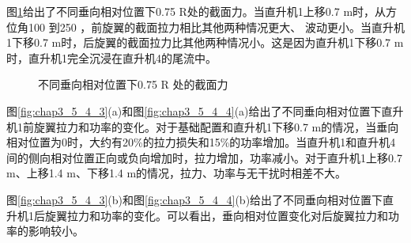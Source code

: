 图\ref{fig:chap3_5_4_2}给出了不同垂向相对位置下0.75 R处的截面力。当直升机1上移0.7 m时，从方位角100 \degree 到250 \degree，前旋翼的截面拉力相比其他两种情况更大、
波动更小。当直升机1下移0.7 m时，后旋翼的截面拉力比其他两种情况小。这是因为直升机1下移0.7 m时，直升机1完全沉浸在直升机4的尾流中。
\begin{figure}[!htb]
  \centering
  \quad
  \caption{不同垂向相对位置下0.75 R 处的截面力}
  \label{fig:chap3_5_4_2}
\end{figure}

图\ref{fig:chap3_5_4_3}(a)和图\ref{fig:chap3_5_4_4}(a)给出了不同垂向相对位置下直升机1前旋翼拉力和功率的变化。对于基础配置和直升机1下移0.7 m的情况，当垂向相对位置为0时，大约有20\%的拉力损失和15\%的功率增加。当直升机1和直升机4间的侧向相对位置正向或负向增加时，拉力增加，功率减小。对于直升机1上移0.7 m、上移1.4 m、下移1.4 m的情况，拉力、功率与无干扰时相差不大。

图\ref{fig:chap3_5_4_3}(b)和图\ref{fig:chap3_5_4_4}(b)给出了不同垂向相对位置下直升机1后旋翼拉力和功率的变化。可以看出，垂向相对位置变化对后旋翼拉力和功率的影响较小。

